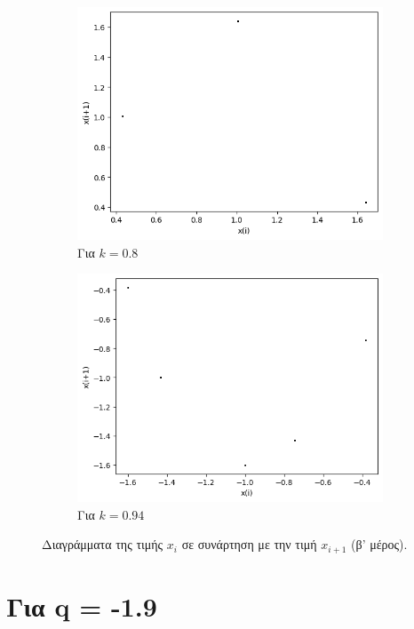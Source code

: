 \begin{figure}[ht]
\begin{subfigure}[b]{0.4\textwidth}
		\includegraphics[width=\textwidth]{LateX images/graphs q16/g19}
		\caption{Για $k=0.8$}
		\label{f:k90}
	\end{subfigure}
	\hfill
	\begin{subfigure}[b]{0.4\textwidth}
		\centering
		\includegraphics[width=\textwidth]{LateX images/graphs q16/g20}
		\caption{Για $k=0.94$}
		\label{f:k91}
	\end{subfigure}
	\hfill
	\caption{Διαγράμματα της τιμής \(x_i\) σε συνάρτηση με την τιμή \(x_{i+1}\) (β' μέρος).}
	\label{f:k241}
\end{figure}


\clearpage
\newpage

\section{Για q = -1.9}

